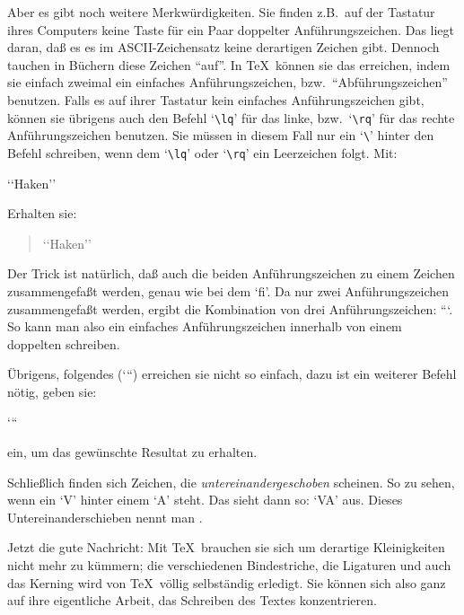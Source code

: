 Aber es gibt noch weitere Merkw\"urdigkeiten. Sie finden z.B.\ auf der
Tastatur ihres Com\-put\-ers keine Taste f\"ur ein Paar
doppelter
Anf\"uhrungszeichen. Das liegt daran, da\ss{} es es im 
ASCII-Zeichensatz
keine derartigen Zeichen gibt. Dennoch tauchen in B\"uchern diese
Zeichen ``auf''. In \TeX\ k\"onnen sie das erreichen, indem sie einfach
zweimal ein einfaches Anf\"uhrungszeichen, bzw.\
``Abf\"uhrungszeichen''
benutzen. Falls es auf ihrer Tastatur kein einfaches Anf\"uhrungszeichen
gibt, k\"onnen sie \"ubrigens auch den Befehl 
`\verb|\lq|' f\"ur das linke,
bzw.\ `\verb|\rq|' f\"ur das rechte An\-f\"uhr\-ungs\-zei\-chen benutzen. Sie
m\"ussen in diesem Fall nur ein `\verb|\|' hinter den Befehl schreiben,
wenn dem `\verb|\lq|' oder `\verb|\rq|' ein \index{Leer!Zeichen}
Leerzeichen folgt. Mit:
\begin{verbatim*}
\lq\lq Haken\rq\rq\ 
\end{verbatim*}
Erhalten sie:
\begin{quote}
\lq\lq Haken\rq\rq\ 
\end{quote}
Der Trick ist nat\"urlich, da\ss{} auch die beiden Anf\"uhrungszeichen zu
einem Zeichen zusammen\-ge\-fa\ss{}t werden, genau wie bei dem `fi'. Da nur
zwei Anf\"uhrungszeichen zusammengefa\ss{}t werden, ergibt die Kombination
von drei Anf\"uhrungszeichen: ```. So kann man also ein einfaches
Anf\"uhrungszeichen innerhalb von einem doppelten schreiben.

\"Ubrigens, folgendes (`\thinspace``) erreichen sie nicht so einfach,
dazu ist ein weiterer Befehl n\"otig, geben sie:
\begin{verbatim*}
`\thinspace``
\end{verbatim*}
ein, um das gew\"unschte Resultat zu erhalten.

Schlie\ss{}lich finden sich Zeichen, die {\em untereinandergeschoben}
scheinen. So zu sehen, wenn ein `V' hinter einem `A' steht. Das sieht
dann so: `VA' aus. Dieses Untereinanderschieben nennt man
\index{Kerning}{\em Kerning}.

Jetzt die gute Nachricht: Mit \TeX\ brauchen sie sich um derartige
Kleinigkeiten nicht mehr zu k\"ummern; die verschiedenen
Bindestriche,
die \index{Ligatur}Ligaturen und auch das \index{Kerning}
Kerning wird von \TeX\ v\"ollig selbst\"andig
erledigt. Sie k\"onnen sich also ganz auf ihre eigentliche Arbeit, das
Schreiben des Textes konzentrieren.
